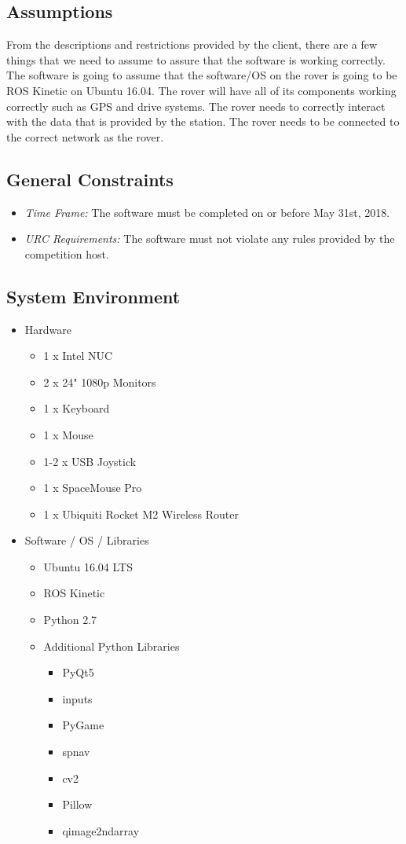 \subsection{Assumptions}
From the descriptions and restrictions provided by the client, there are a few things that we need to assume to assure that the software is working correctly. 
The software is going to assume that the software/OS on the rover is going to be ROS Kinetic on Ubuntu 16.04. 
The rover will have all of its components working correctly such as GPS and drive systems.
The rover needs to correctly interact with the data that is provided by the station. 
The rover needs to be connected to the correct network as the rover.


\subsection{General Constraints}
\begin{itemize}
\item \textit{Time Frame:} The software must be completed on or before May 31st, 2018.
\item \textit{URC Requirements:} The software must not violate any rules provided by the competition host. \cite{urc_competition_rules}
\end{itemize}


\subsection{System Environment}
\begin{itemize}
\item Hardware
  \begin{itemize}
  \item 1 x Intel NUC
  \item 2 x 24" 1080p Monitors
  \item 1 x Keyboard
  \item 1 x Mouse
  \item 1-2 x USB Joystick
  \item 1 x SpaceMouse Pro
  \item 1 x Ubiquiti Rocket M2 Wireless Router
  \end{itemize}
\item Software / OS / Libraries
  \begin{itemize}
  \item Ubuntu 16.04 LTS
  \item ROS Kinetic
  \item Python 2.7
  \item Additional Python Libraries
    \begin{itemize}
    \item PyQt5
    \item inputs
    \item PyGame
    \item spnav
    \item cv2
    \item Pillow
    \item qimage2ndarray
    \end{itemize}
  \end{itemize}
\end{itemize}


